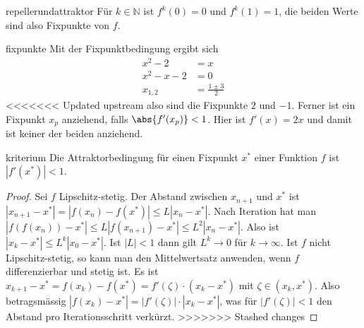 \documentclass[%
<<<<<<< Updated upstream
<<<<<<< Updated upstream
11pt,%
twoside,%
titlepage,%
german,%
headsepline%
]{scrartcl}
\begin{document}
\begin{lsg}{repellerundattraktor}
Für $k\in\mathbb{N}$ ist $f^{k}(0)=0$ und $f^{k}(1)=1$, die beiden Werte sind also Fixpunkte von $f$.
\end{lsg}
\begin{lsg}{fixpunkte}
Mit der Fixpunktbedingung ergibt sich
\begin{align*}
x^2-2 &= x\\
x^2-x-2 &= 0\\
x_{1,2} &= \frac{1\pm3}{2}
\end{align*}
<<<<<<< Updated upstream
also sind die Fixpunkte $2$ und $-1$. Ferner ist ein Fixpunkt $x_p$ anziehend, falls $\abs{f'(x_p)}<1$. Hier ist $f'(x)=2x$ und damit ist keiner der beiden anziehend.
\end{lsg}
\begin{lsg}{kriterium}
Die Attraktorbedingung für einen Fixpunkt $x^*$ einer Funktion $f$ ist $|f'(x^*)|<1$.
\begin{proof}
Sei $f$ Lipschitz-stetig. Der Abstand zwischen $x_{n+1}$ und $x^*$ ist $|x_{n+1}-x^*|=|f(x_n)-f(x^*)|\leq L|x_n-x^*|$. Nach Iteration hat man $|f(f(x_n))-x^*|\leq L|f(x_{n+1})-x^*|\leq L^2|x_n-x^*|$. Also ist $|x_k-x^*|\leq L^k|x_0-x^*|$. Ist $|L|<1$ dann gilt $L^k\to0$ für $k\to\infty$. Ist $f$ nicht Lipschitz-stetig, so kann man den Mittelwertsatz anwenden, wenn $f$ differenzierbar und stetig ist. Es ist $x_{k+1}-x^*=f(x_k)-f(x^*)=f'(\zeta)\cdot(x_k-x^*)$ mit $\zeta\in(x_k,x^*)$. Also betragsmässig $|f(x_k)-x^*| = |f'(\zeta)|\cdot|x_k-x^*|$, was für $|f'(\zeta)|<1$ den Abstand pro Iterationsschritt verkürzt.
>>>>>>> Stashed changes
\end{proof}
\end{lsg}
\end{document}
